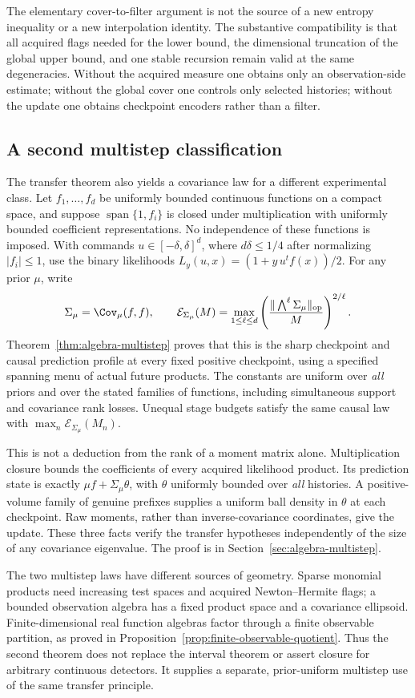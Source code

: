\documentclass[11pt]{amsart}
\theoremstyle{definition}\newtheorem{definition}[theorem]{Definition}
\theoremstyle{remark}\newtheorem{remark}[theorem]{Remark}
\begin{document}
The elementary cover-to-filter argument is not the source of a new
entropy inequality or a new interpolation identity. The substantive
compatibility is that all acquired flags needed for the lower bound,
the dimensional truncation of the global upper bound, and one stable
recursion remain valid at the same degeneracies. Without the acquired
measure one obtains only an observation-side estimate; without the
global cover one controls only selected histories; without the update
one obtains checkpoint encoders rather than a filter.

\subsection{A second multistep classification}
The transfer theorem also yields a covariance law for a different
experimental class. Let $f_1,\ldots,f_d$ be uniformly bounded continuous
functions on a compact space, and suppose $\operatorname{span}\{1,f_i\}$
is closed under multiplication with uniformly bounded coefficient
representations. No independence of these functions is imposed. With
commands $u\in[-\delta,\delta]^d$, where $d\delta\le1/4$ after
normalizing $|f_i|\le1$, use the binary likelihoods
$L_y(u,x)=(1+y\,u^tf(x))/2$. For any prior $\mu$, write
\[
 \Sigma_\mu=\Cov_\mu(f,f),\qquad
 \mathcal E_{\Sigma_\mu}(M)=
 \max_{1\le\ell\le d}
 \left(\frac{\|\bigwedge^\ell\Sigma_\mu\|_{\rm op}}{M}\right)^{2/\ell}.
\]
Theorem~\ref{thm:algebra-multistep} proves that this is the sharp
checkpoint and causal prediction profile at every fixed positive
checkpoint, using a specified spanning menu of actual future products.
The constants are uniform over \emph{all} priors and over the stated
families of functions, including simultaneous support and covariance
rank losses. Unequal stage budgets satisfy the same causal law with
$\max_n\mathcal E_{\Sigma_\mu}(M_n)$.

This is not a deduction from the rank of a moment matrix alone.
Multiplication closure bounds the coefficients of every acquired
likelihood product. Its prediction state is exactly
$\mu f+\Sigma_\mu\theta$, with $\theta$ uniformly bounded over
\emph{all} histories. A positive-volume family of genuine prefixes
supplies a uniform ball density in $\theta$ at each checkpoint.
Raw moments, rather than inverse-covariance coordinates, give the
update. These three facts verify the transfer hypotheses independently
of the size of any covariance eigenvalue. The proof is in
Section~\ref{sec:algebra-multistep}.

The two multistep laws have different sources of geometry. Sparse
monomial products need increasing test spaces and acquired
Newton--Hermite flags; a bounded observation algebra has a fixed
product space and a covariance ellipsoid. Finite-dimensional real
function algebras factor through a finite observable partition, as
proved in Proposition~\ref{prop:finite-observable-quotient}. Thus the
second theorem does not replace the interval theorem or assert closure
for arbitrary continuous detectors. It supplies a separate,
prior-uniform multistep use of the same transfer principle.
\end{document}
